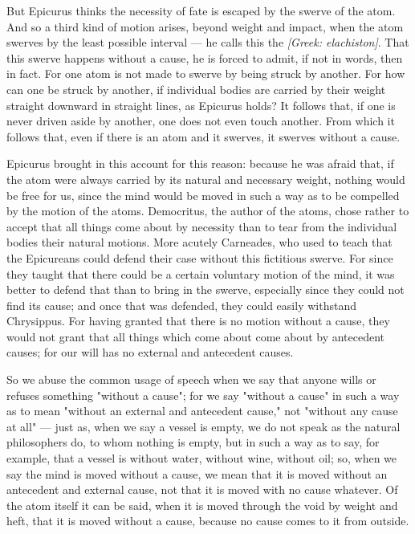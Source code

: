  But Epicurus thinks the necessity of fate is escaped by the swerve of the atom. And so a third kind of motion arises, beyond weight and impact, when the atom swerves by the least possible interval — he calls this the \textit{[Greek: elachiston]}. That this swerve happens without a cause, he is forced to admit, if not in words, then in fact. For one atom is not made to swerve by being struck by another. For how can one be struck by another, if individual bodies are carried by their weight straight downward in straight lines, as Epicurus holds? It follows that, if one is never driven aside by another, one does not even touch another. From which it follows that, even if there is an atom and it swerves, it swerves without a cause.

 Epicurus brought in this account for this reason: because he was afraid that, if the atom were always carried by its natural and necessary weight, nothing would be free for us, since the mind would be moved in such a way as to be compelled by the motion of the atoms. Democritus, the author of the atoms, chose rather to accept that all things come about by necessity than to tear from the individual bodies their natural motions. More acutely Carneades, who used to teach that the Epicureans could defend their case without this fictitious swerve. For since they taught that there could be a certain voluntary motion of the mind, it was better to defend that than to bring in the swerve, especially since they could not find its cause; and once that was defended, they could easily withstand Chrysippus. For having granted that there is no motion without a cause, they would not grant that all things which come about come about by antecedent causes; for our will has no external and antecedent causes.

 So we abuse the common usage of speech when we say that anyone wills or refuses something "without a cause"; for we say "without a cause" in such a way as to mean "without an external and antecedent cause," not "without any cause at all" — just as, when we say a vessel is empty, we do not speak as the natural philosophers do, to whom nothing is empty, but in such a way as to say, for example, that a vessel is without water, without wine, without oil; so, when we say the mind is moved without a cause, we mean that it is moved without an antecedent and external cause, not that it is moved with no cause whatever. Of the atom itself it can be said, when it is moved through the void by weight and heft, that it is moved without a cause, because no cause comes to it from outside.

